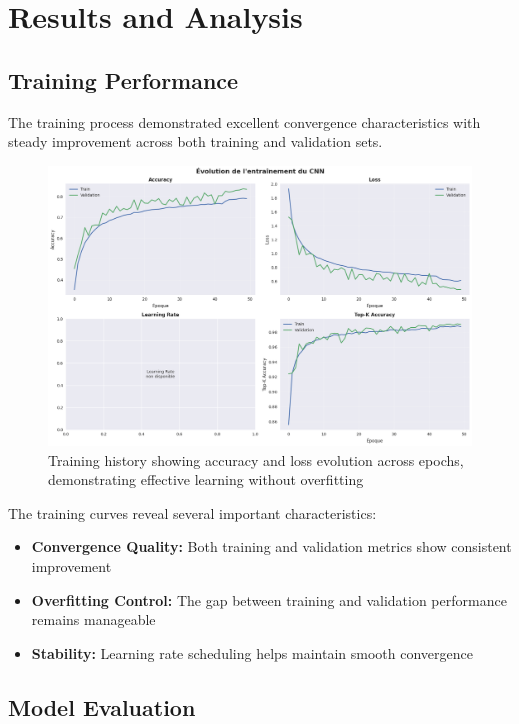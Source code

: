 \documentclass[11pt,a4paper]{article}
\begin{document}
\section{Results and Analysis}

\subsection{Training Performance}

The training process demonstrated excellent convergence characteristics with steady improvement across both training and validation sets.

\begin{figure}[H]
    \centering
    \includegraphics[width=\textwidth]{tp2_cnn_img/cell_19_output_00_image_04.png}
    \caption{Training history showing accuracy and loss evolution across epochs, demonstrating effective learning without overfitting}
    \label{fig:training_history}
\end{figure}

The training curves reveal several important characteristics:

\begin{itemize}
    \item \textbf{Convergence Quality:} Both training and validation metrics show consistent improvement
    \item \textbf{Overfitting Control:} The gap between training and validation performance remains manageable
    \item \textbf{Stability:} Learning rate scheduling helps maintain smooth convergence
\end{itemize}

\subsection{Model Evaluation}
\end{document}
